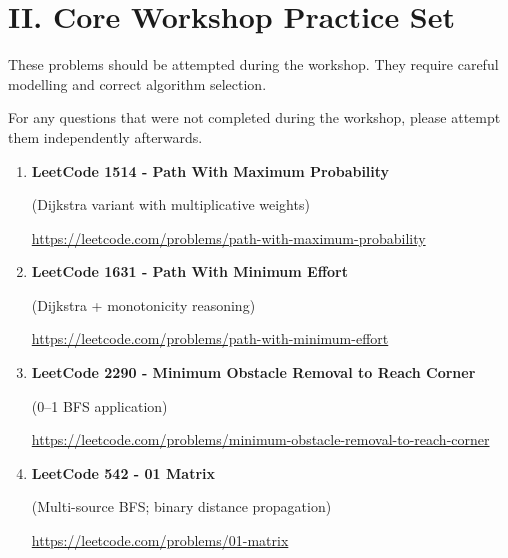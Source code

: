 \documentclass[11pt]{article}
\begin{document}
\section*{II. Core Workshop Practice Set}

These problems should be attempted during the workshop.  
They require careful modelling and correct algorithm selection.

For any questions that were not completed during the workshop, please attempt them independently afterwards.

\begin{enumerate}

    \item \textbf{LeetCode 1514 - Path With Maximum Probability}

    (Dijkstra variant with multiplicative weights)

    \vspace{0.3em}
    {\url{https://leetcode.com/problems/path-with-maximum-probability}}

    \vspace{0.8em}

    \item \textbf{LeetCode 1631 - Path With Minimum Effort}

    (Dijkstra + monotonicity reasoning)

    \vspace{0.3em}
    {\url{https://leetcode.com/problems/path-with-minimum-effort}}

    \vspace{0.8em}

    \item \textbf{LeetCode 2290 - Minimum Obstacle Removal to Reach Corner}

    (0--1 BFS application)

    \vspace{0.3em}
    {\url{https://leetcode.com/problems/minimum-obstacle-removal-to-reach-corner}}

    \vspace{0.8em}

    \item \textbf{LeetCode 542 - 01 Matrix}

    (Multi-source BFS; binary distance propagation)

    \vspace{0.3em}
    {\url{https://leetcode.com/problems/01-matrix}}

    \vspace{0.8em}


\end{enumerate}
\end{document}
